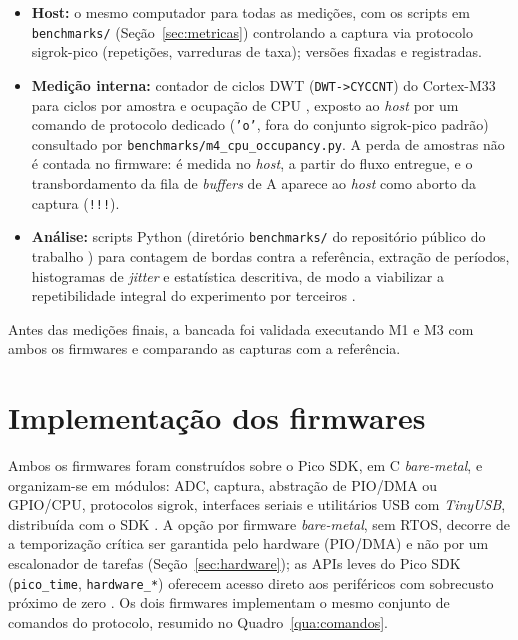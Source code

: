 \begin{itemize}
  \item \textbf{Host:} o mesmo computador para todas as medições, com os scripts em \texttt{benchmarks/} (Seção~\ref{sec:metricas}) controlando a captura via protocolo sigrok-pico (repetições, varreduras de taxa); versões fixadas e registradas.

  \item \textbf{Medição interna:} contador de ciclos \ac{DWT} (\texttt{DWT->CYCCNT}) do Cortex-M33 para ciclos por amostra e ocupação de \ac{CPU} \cite{arm2021}, exposto ao \emph{host} por um comando de protocolo dedicado (\texttt{'o'}, fora do conjunto sigrok-pico padrão) consultado por \texttt{benchmarks/m4\_cpu\_occupancy.py}. A perda de amostras não é contada no firmware: é medida no \emph{host}, a partir do fluxo entregue, e o transbordamento da fila de \emph{buffers} de A aparece ao \emph{host} como aborto da captura (\texttt{!!!}).

  \item \textbf{Análise:} scripts Python (diretório \texttt{benchmarks/} do repositório público do trabalho \cite{dias2026artefatos}) para contagem de bordas contra a referência, extração de períodos, histogramas de \emph{jitter} e estatística descritiva, de modo a viabilizar a repetibilidade integral do experimento por terceiros \cite{collberg2016}.
\end{itemize}

Antes das medições finais, a bancada foi validada executando M1 e M3 com
ambos os firmwares e comparando as capturas com a referência.

\section{Implementação dos firmwares}\label{sec:firmware}

Ambos os firmwares foram construídos sobre o Pico \ac{SDK}, em C
\emph{bare-metal}, e organizam-se em módulos: \ac{ADC}, captura, abstração de
\ac{PIO}/DMA ou \ac{GPIO}/CPU, protocolos sigrok, interfaces seriais e utilitários \ac{USB}
com \emph{TinyUSB}, distribuída com o \ac{SDK} \cite{rpi2024sdk}. A opção por
firmware \emph{bare-metal}, sem \ac{RTOS}, decorre de a temporização crítica
ser garantida pelo hardware (\ac{PIO}/DMA) e não por um escalonador de tarefas
(Seção~\ref{sec:hardware}); as \acp{API} leves do Pico \ac{SDK} (\texttt{pico\_time},
\texttt{hardware\_*}) oferecem acesso direto aos periféricos com sobrecusto
próximo de zero \cite{rpi2024sdk}. Os dois firmwares implementam o mesmo
conjunto de comandos do protocolo, resumido no Quadro~\ref{qua:comandos}.

